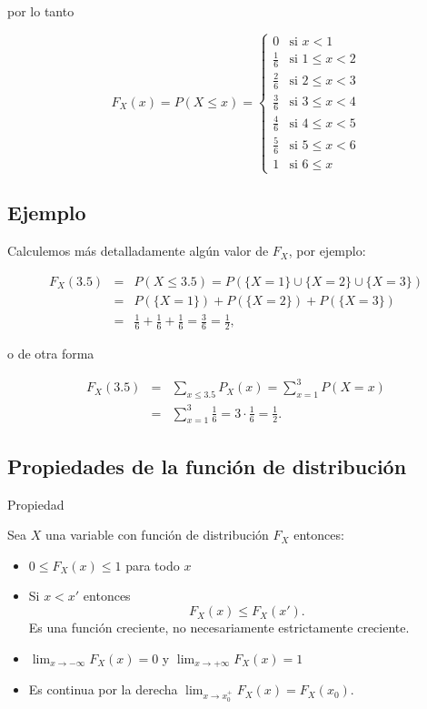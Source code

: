 \documentclass[]{book}
\providecommand{\tightlist}{%
  \setlength{\itemsep}{0pt}\setlength{\parskip}{0pt}}
\begin{document}
por lo tanto

\[F_{X}(x)=P(X\leq x)=\left\{\begin{array}{ll}
   0 & \mbox{si } x<1\\
   \frac16 &\mbox{si } 1\leq x<2\\
   \frac26 &\mbox{si } 2\leq x<3\\
   \frac36 &\mbox{si } 3\leq x<4\\
   \frac46 &\mbox{si } 4\leq x<5\\
   \frac56 &\mbox{si } 5\leq x<6\\
   1 &\mbox{si } 6\leq x\end{array}\right.\]

\hypertarget{ejemplo-12}{%
\subsection{Ejemplo}\label{ejemplo-12}}

Calculemos más detalladamente algún valor de \(F_{X}\), por ejemplo:

\begin{eqnarray*}
F_{X}(3.5) & = & P(X\leq 3.5)=  P(\{X=1\}\cup\{X=2\}\cup \{X=3\})\\
&=& P(\{X=1\})+P(\{X=2\})+P(\{X=3\})\\
&=& \frac16+\frac16+\frac16=\frac36 =\frac12,
\end{eqnarray*}

o de otra forma

\begin{eqnarray*}
F_{X}(3.5)&=&\sum_{x\leq 3.5} P_X(x)=\sum_{x=1}^3 P(X=x)\\&=&\sum_{x=1}^3 \frac16= 3 \cdot
   \frac16=\frac12.
\end{eqnarray*}

\hypertarget{propiedades-de-la-funciuxf3n-de-distribuciuxf3n}{%
\subsection{Propiedades de la función de distribución}\label{propiedades-de-la-funciuxf3n-de-distribuciuxf3n}}

 Propiedad

Sea \(X\) una variable con función de distribución \(F_{X}\) entonces:

\begin{itemize}
\tightlist
\item
  \(0\leq F_{X}(x)\leq 1\) para todo \(x\)
\item
  Si \(x<x'\) entonces \[F_{X}(x)\leq F_{X}(x').\]
  Es una función creciente, no necesariamente estrictamente creciente.
\item
  \(\displaystyle \lim_{x\to -\infty}F_{X}(x)=0\) y \(\displaystyle \lim_{x\to +\infty}F_{X}(x)=1\)
\item
  Es continua por la derecha \(\displaystyle \lim_{x\to x_0^{+}}F_{X}(x)=F_{X}(x_0)\).
\end{itemize}
\end{document}
